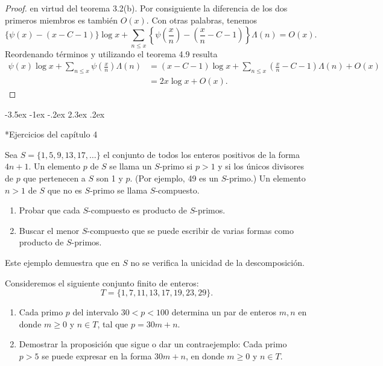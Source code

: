 \documentclass[12pt,a4paper]{book}
\makeatletter
\renewcommand\section{\@startsection{section}{1}{\z@}%
  {-3.5ex \@plus -1ex \@minus -.2ex}%
  {2.3ex \@plus .2ex}%
  {\normalfont\Large\bfseries\raggedright}}
\makeatother
\begin{document}
\begin{proof}
        en virtud del teorema 3.2(b). Por consiguiente la diferencia de los dos
        primeros miembros es también $O(x)$. Con otras palabras, tenemos
        \begin{equation*}
            \{\psi(x)-(x-C-1)\}\log x+\sum_{n\leq x}\left\{\psi\left(\frac{x}{n}\right)
            -\left(\frac{x}{n}-C-1\right)\right\}\Lambda(n)=O(x).
        \end{equation*}
        Reordenando términos y utilizando el teorema 4.9 resulta
        \begin{align*}
            \psi(x)\log x+\sum_{n\leq x}\psi\left(\frac{x}{n}\right)\Lambda(n)
            &=(x-C-1)\log x+\sum_{n\leq x}\left(\frac{x}{n}-C-1\right)\Lambda(n)+O(x)\\
            &=2x\log x+O(x).
        \end{align*}
    \end{proof}

    \section*{Ejercicios del capítulo 4}

    \begin{ejercicio}
        Sea $S=\{1,5,9,13,17,\dots\}$ el conjunto de todos los enteros positivos de la
        forma $4n+1$. Un elemento $p$ de $S$ se llama un $S$-primo si $p>1$ y si los
        únicos divisores de $p$ que pertenecen a $S$ son 1 y $p$. (Por ejemplo, 49 es
        un $S$-primo.) Un elemento $n>1$ de $S$ que no es $S$-primo se llama
        $S$-compuesto.
        \begin{enumerate}
            \item[(a)] Probar que cada $S$-compuesto es producto de $S$-primos.
            \item[(b)] Buscar el menor $S$-compuesto que se puede escribir de varias
            formas como producto de $S$-primos.
        \end{enumerate}
        Este ejemplo demuestra que en $S$ no se verifica la unicidad de la
        descomposición.
    \end{ejercicio}

    \begin{ejercicio}
        Consideremos el siguiente conjunto finito de enteros:
        \begin{equation*}
            T=\{1,7,11,13,17,19,23,29\}.
        \end{equation*}
        \begin{enumerate}
            \item[(a)] Cada primo $p$ del intervalo $30<p<100$ determina un par de
            enteros $m,n$ en donde $m\geq0$ y $n\in T$, tal que $p=30m+n$.
            \item[(b)] Demostrar la proposición que sigue o dar un contraejemplo:
            Cada primo $p>5$ se puede expresar en la forma $30m+n$, en donde $m\geq0$
            y $n\in T$.
        \end{enumerate}
    \end{ejercicio}
\end{document}
